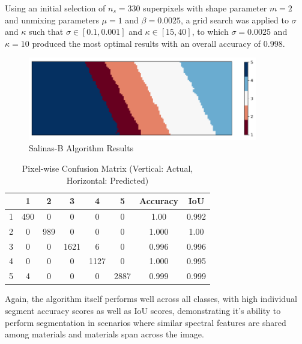 Using an initial selection of $n_s = 330$ superpixels with shape parameter $m=2$ and unmixing parameters $\mu = 1$ and $\beta = 0.0025$, a grid search was applied to $\sigma$ and $\kappa$ such that $\sigma \in [0.1, 0.001]$ and $\kappa \in [15, 40]$, to which $\sigma = 0.0025$ and $\kappa = 10$ produced the most optimal results with an overall accuracy of $0.998$. 
\begin{figure}[H]
    \centering
    \includegraphics[width=10cm]{salinas-b-labelled.png}  %
    \caption{Salinas-B Algorithm Results}
    \label{salina-b-results}  %
\end{figure}
\begin{table}[H]
    \centering
    \label{tab:salinas_b_cfm}
    \begin{tabular}{|c|ccccc|c|c|}
        \hline
         & \textbf{1} & \textbf{2} & \textbf{3} & \textbf{4} & \textbf{5} & \textbf{Accuracy} & \textbf{IoU} \\ \hline
        1     &  490    &  0    &  0    &  0        &  0    &  1.00 & 0.992  \\ 
        2      &  0    & 989  &  0    &  0        &  0    &  1.000   & 1.00\\ 
        3      &  0    &  0    &  1621  &  6       &  0    &  0.996  & 0.996\\ 
        4      &  0    &  0    &  0    & 1127    &  0    &  1.000  & 0.995\\ 
        5      &  4   &  0    &  0    &  0      &  2887    &  0.999  & 0.999\\ \hline
    \end{tabular}
    \caption{Pixel-wise Confusion Matrix (Vertical: Actual, Horizontal: Predicted)}
\end{table}
Again, the algorithm itself performs well across all classes, with high individual segment accuracy scores as well as IoU scores, demonstrating it's ability to perform segmentation in scenarios where similar spectral features are shared among materials and materials span across the image.

    


